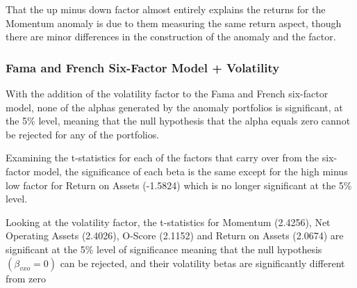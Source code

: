 \documentclass[a4paper]{article}                 %
\begin{document}
That the up minus down factor almost entirely explains the returns for the Momentum anomaly is due to them measuring the same return aspect, though there are minor differences in the construction of the anomaly and the factor.

\subsubsection{Fama and French Six-Factor Model + Volatility}
With the addition of the volatility factor to the Fama and French six-factor model, none of the alphas generated by the anomaly portfolios is significant, at the 5\% level, meaning that the null hypothesis that the alpha equals zero cannot be rejected for any of the portfolios. 

Examining the t-statistics for each of the factors that carry over from the six-factor model, the significance of each beta is the same except for the high minus low factor for Return on Assets (-1.5824) which is no longer significant at the 5\% level. 

Looking at the volatility factor, the t-statistics for Momentum (2.4256), Net Operating Assets (2.4026), O-Score (2.1152) and Return on Assets (2.0674) are significant at the 5\% level of significance meaning that the null hypothesis $(\beta_{vxo}= 0)$ can be rejected, and their volatility betas are significantly different from zero







\end{document}

